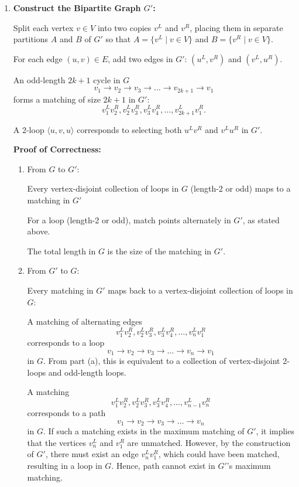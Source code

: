 \documentclass[11pt]{article}
\begin{document}
\begin{description}
\begin{enumerate}
  \item[(c)]
  \textbf{Construct the Bipartite Graph \( G' \):}

  Split each vertex \( v \in V \) into two copies \( v^L \) and \( v^R \), placing them in separate partitions \( A \) and \( B \) of \( G' \) so that \( A = \{v^L \mid v \in V\} \) and \( B = \{v^R \mid v \in V\} \).

  For each edge \( (u,v) \in E \), add two edges in \( G' \):
  \( (u^L, v^R) \) and \( (v^L, u^R) \).

  An odd-length \( 2k+1 \) cycle in \( G \)
  \[
  v_1 \to v_2 \to v_3 \to \dots \to v_{2k+1} \to v_1
  \]
  forms a matching of size \( 2k+1 \) in \( G' \):
  \[
  v_1^Lv_2^R, v_2^Lv_3^R, v_3^Lv_4^R, \dots, v_{2k+1}^Lv_1^R.
  \]

  A 2-loop \( \langle u, v, u \rangle \) corresponds to selecting 
  both \( u^Lv^R \) and \( v^Lu^R \) in \( G' \). 

  \textbf{Proof of Correctness:}
  \begin{enumerate}
    \item[i.] From \( G \) to \( G' \):

    Every vertex-disjoint collection of loops in \( G \) (length-2 or odd) maps to a matching in \( G' \)

    For a loop (length-2 or odd), match points alternately in \( G' \), as stated above.

    The total length in \( G \) is the size of the matching in \( G' \).

    \item[ii.] From \( G' \) to \( G \):

    Every matching in \( G' \) maps back to a vertex-disjoint collection of loops in \( G \):

    A matching of alternating edges 
    \[
    v_1^Lv_2^R, v_2^Lv_3^R, v_3^Lv_4^R, \dots, v_n^Lv_1^R
    \]
    corresponds to a loop 
    \[
    v_1\to v_2\to v_3\to \dots \to v_n \to v_1
    \]
    in \( G \). From part (a), this is equivalent to a collection of vertex-disjoint
    2-loops and odd-length loops.

    A matching
    \[
    v_1^Lv_2^R, v_2^Lv_3^R, v_3^Lv_4^R, \dots, v_{n-1}^Lv_n^R
    \]
    corresponds to a path
    \[
    v_1\to v_2\to v_3\to \dots \to v_n
    \]
    in \( G \). 
    If such a matching exists in the maximum matching of \(G'\), 
    it implies that the vertices \(v_n^L\) and \(v_1^R\) are unmatched. 
    However, by the construction of \(G'\), there must exist an edge \(v_n^Lv_1^R\), 
    which could have been matched, resulting in a loop in \(G\). 
    Hence, path cannot exist in \(G'\)'s maximum matching.


\end{enumerate}
\end{enumerate}
\end{description}
\end{document}
